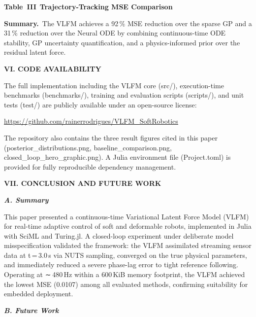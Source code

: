 \documentclass[letterpaper, 10pt, journal, twoside]{IEEEtran}
\begin{document}
\textbf{Table~III Trajectory-Tracking MSE Comparison}

\textbf{Summary. }The VLFM achieves a 92\,\% MSE reduction over the
sparse GP and a 31\,\% reduction over the Neural ODE by combining
continuous-time ODE stability, GP uncertainty quantification, and a
physics-informed prior over the residual latent force.

\textbf{VI. CODE AVAILABILITY}

The full implementation including the VLFM core (src/), execution-time
benchmarks (benchmarks/), training and evaluation scripts (scripts/),
and unit tests (test/) are publicly available under an open-source
license:

\href{https://github.com/rainerrodrigues/VLFM_SoftRobotics}{\ul{https://github.com/rainerrodrigues/VLFM\_SoftRobotics}}

The repository also contains the three result figures cited in this
paper (posterior\_distributions.png, baseline\_comparison.png,
closed\_loop\_hero\_graphic.png). A Julia environment file
(Project.toml) is provided for fully reproducible dependency management.

\textbf{VII. CONCLUSION AND FUTURE WORK}

\emph{\textbf{A. Summary}}

This paper presented a continuous-time Variational Latent Force Model
(VLFM) for real-time adaptive control of soft and deformable robots,
implemented in Julia with SciML and Turing.jl. A closed-loop experiment
under deliberate model misspecification validated the framework: the
VLFM assimilated streaming sensor data at t\,=\,3.0\,s via NUTS
sampling, converged on the true physical parameters, and immediately
reduced a severe phase-lag error to tight reference following. Operating
at ∼ 480\,Hz within a 600\,KiB memory footprint, the VLFM achieved the
lowest MSE (0.0107) among all evaluated methods, confirming suitability
for embedded deployment.

\emph{\textbf{B. Future Work}}
\end{document}
